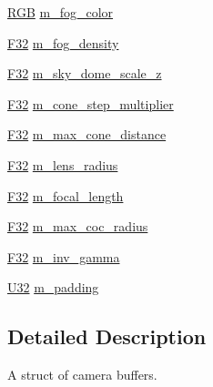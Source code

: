 \begin{DoxyCompactItemize}
\mbox{\hyperlink{structmage_1_1_r_g_b}{R\+GB}} \mbox{\hyperlink{structmage_1_1rendering_1_1_camera_buffer_a6f963e7d607c59ab0dfc3972e06a9739}{m\+\_\+fog\+\_\+color}}
\item 
\mbox{\hyperlink{namespacemage_aa97e833b45f06d60a0a9c4fc22ae02c0}{F32}} \mbox{\hyperlink{structmage_1_1rendering_1_1_camera_buffer_aa9c3a305adfbeb717d480e822ed1c77e}{m\+\_\+fog\+\_\+density}}
\item 
\mbox{\hyperlink{namespacemage_aa97e833b45f06d60a0a9c4fc22ae02c0}{F32}} \mbox{\hyperlink{structmage_1_1rendering_1_1_camera_buffer_abfb4dbb9a228b6a7412b09b179fd157d}{m\+\_\+sky\+\_\+dome\+\_\+scale\+\_\+z}}
\item 
\mbox{\hyperlink{namespacemage_aa97e833b45f06d60a0a9c4fc22ae02c0}{F32}} \mbox{\hyperlink{structmage_1_1rendering_1_1_camera_buffer_a802e8c4ba601b91658cb30c2f1c2cfe2}{m\+\_\+cone\+\_\+step\+\_\+multiplier}}
\item 
\mbox{\hyperlink{namespacemage_aa97e833b45f06d60a0a9c4fc22ae02c0}{F32}} \mbox{\hyperlink{structmage_1_1rendering_1_1_camera_buffer_a99515c320feafb88a2d2fdf24520975d}{m\+\_\+max\+\_\+cone\+\_\+distance}}
\item 
\mbox{\hyperlink{namespacemage_aa97e833b45f06d60a0a9c4fc22ae02c0}{F32}} \mbox{\hyperlink{structmage_1_1rendering_1_1_camera_buffer_a7915bec843e03ad2248c08b10317ccc7}{m\+\_\+lens\+\_\+radius}}
\item 
\mbox{\hyperlink{namespacemage_aa97e833b45f06d60a0a9c4fc22ae02c0}{F32}} \mbox{\hyperlink{structmage_1_1rendering_1_1_camera_buffer_a7ed5079582d476597f8bc4d6a0b3f372}{m\+\_\+focal\+\_\+length}}
\item 
\mbox{\hyperlink{namespacemage_aa97e833b45f06d60a0a9c4fc22ae02c0}{F32}} \mbox{\hyperlink{structmage_1_1rendering_1_1_camera_buffer_a3273510e0a7bbdd9481fe67f9e223f59}{m\+\_\+max\+\_\+coc\+\_\+radius}}
\item 
\mbox{\hyperlink{namespacemage_aa97e833b45f06d60a0a9c4fc22ae02c0}{F32}} \mbox{\hyperlink{structmage_1_1rendering_1_1_camera_buffer_a0ff45fc9f243d43fa43952b026900ade}{m\+\_\+inv\+\_\+gamma}}
\item 
\mbox{\hyperlink{namespacemage_a41c104c036fba3756a74e19f793eeaa1}{U32}} \mbox{\hyperlink{structmage_1_1rendering_1_1_camera_buffer_a89a72a725654361121771db8668f7f58}{m\+\_\+padding}}
\end{DoxyCompactItemize}


\subsection{Detailed Description}
A struct of camera buffers. 


